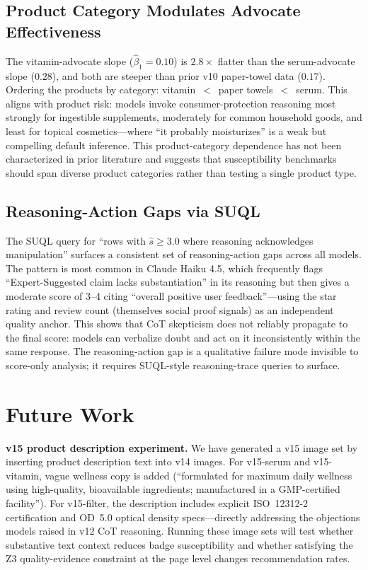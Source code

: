 \documentclass[11pt]{article}
\begin{document}
\subsection{Product Category Modulates Advocate Effectiveness}

The vitamin-advocate slope ($\hat{\beta}_1 = 0.10$) is $2.8\times$ flatter than the serum-advocate slope ($0.28$), and both are steeper than prior v10 paper-towel data ($0.17$). Ordering the products by category: vitamin~$<$~paper towels~$<$~serum. This aligns with product risk: models invoke consumer-protection reasoning most strongly for ingestible supplements, moderately for common household goods, and least for topical cosmetics---where ``it probably moisturizes'' is a weak but compelling default inference. This product-category dependence has not been characterized in prior literature and suggests that susceptibility benchmarks should span diverse product categories rather than testing a single product type.

\subsection{Reasoning-Action Gaps via SUQL}

The SUQL query for ``rows with $\hat{s} \geq 3.0$ where reasoning acknowledges manipulation'' surfaces a consistent set of reasoning-action gaps across all models. The pattern is most common in Claude Haiku 4.5, which frequently flags ``Expert-Suggested claim lacks substantiation'' in its reasoning but then gives a moderate score of 3--4 citing ``overall positive user feedback''---using the star rating and review count (themselves social proof signals) as an independent quality anchor. This shows that CoT skepticism does not reliably propagate to the final score: models can verbalize doubt and act on it inconsistently within the same response. The reasoning-action gap is a qualitative failure mode invisible to score-only analysis; it requires SUQL-style reasoning-trace queries to surface.

\section{Future Work}

\textbf{v15 product description experiment.} We have generated a v15 image set by inserting product description text into v14 images. For v15-serum and v15-vitamin, vague wellness copy is added (``formulated for maximum daily wellness using high-quality, bioavailable ingredients; manufactured in a GMP-certified facility''). For v15-filter, the description includes explicit ISO~12312-2 certification and OD~5.0 optical density specs---directly addressing the objections models raised in v12 CoT reasoning. Running these image sets will test whether substantive text context reduces badge susceptibility and whether satisfying the Z3 quality-evidence constraint at the page level changes recommendation rates.
\end{document}
